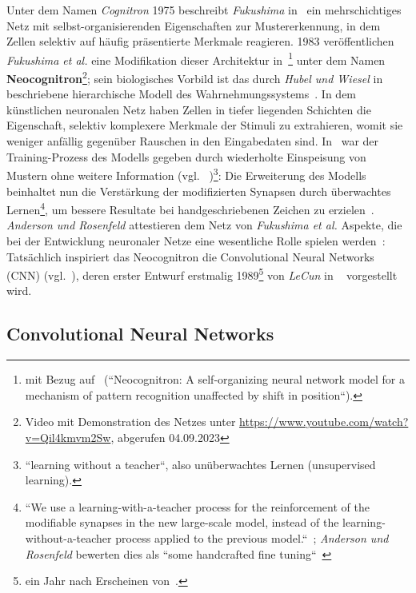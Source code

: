 Unter dem Namen \textit{Cognitron} 1975 beschreibt \textit{Fukushima} in~\cite{Fuk75} ein mehrschichtiges Netz mit selbst-organisierenden Eigenschaften zur Mustererkennung, in dem Zellen selektiv auf häufig präsentierte Merkmale reagieren.
1983 veröffentlichen \textit{Fukushima et al.} eine Modifikation dieser Architektur in~\cite{FMI83}\footnote{
    mit Bezug auf~\cite{Fuk80} (``Neocognitron: A self-organizing neural network model for a mechanism of pattern recognition unaffected by shift in position``).
} unter dem Namen \textbf{Neocognitron}\footnote{
    Video mit Demonstration des Netzes unter \url{https://www.youtube.com/watch?v=Qil4kmvm2Sw}, abgerufen 04.09.2023
}; sein biologisches Vorbild ist das durch \textit{Hubel und Wiesel} in~\cite{HW62} beschriebene hierarchische Modell des Wahrnehmungssystems~\cite[827]{FMI83}.
In dem künstlichen neuronalen Netz haben Zellen in tiefer liegenden Schichten die Eigenschaft, selektiv komplexere Merkmale der Stimuli zu extrahieren, womit sie weniger anfällig gegenüber Rauschen in den Eingabedaten sind.
In~\cite{Fuk80} war der Training-Prozess des Modells gegeben durch wiederholte Einspeisung von Mustern ohne weitere Information (vgl. ~\cite[197]{Fuk80})\footnote{
    ``learning without a teacher``, also unüberwachtes Lernen (unsupervised learning).
}: Die Erweiterung des Modells beinhaltet nun die Verstärkung der modifizierten Synapsen durch überwachtes Lernen\footnote{
    ``We use a learning-with-a-teacher process for the reinforcement of the modifiable synapses in the new large-scale
model, instead of the learning-without-a-teacher process applied to the previous model.``~\cite[827]{FMI83}; \textit{Anderson und Rosenfeld} bewerten dies als ``some handcrafted fine tuning``~\cite[524 f.]{AR88}
}, um bessere Resultate bei handgeschriebenen Zeichen zu erzielen~\cite[829]{FMI83}.
\textit{Anderson und Rosenfeld} attestieren dem Netz von \textit{Fukushima et al.} Aspekte, die bei der Entwicklung neuronaler Netze eine wesentliche Rolle spielen werden~\cite[524]{AR88}:  Tatsächlich inspiriert das Neocognitron die Convolutional Neural Networks (CNN) (vgl.~\cite[439]{LBH15}), deren erster Entwurf erstmalig 1989\footnote{
    ein Jahr nach Erscheinen von~\cite{AR88}.
} von \textit{LeCun} in ~\cite{Cun89} vorgestellt wird.



\subsection{Convolutional Neural Networks}\label{cnn}

